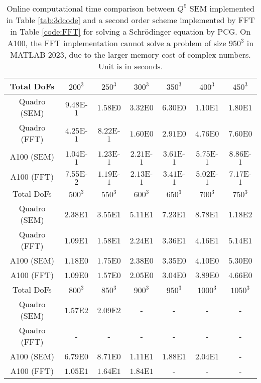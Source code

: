 \documentclass{article}
\begin{document}
\begin{table}[ht!]
    \centering
    \begin{tabular}{|c|c|c|c|c|c|c|}
    \hline
         Total DoFs  & $200^3$ & $250^3$ & $300^3$ & $350^3$ & $400^3$ & $450^3$\\
    \hline
         Quadro (SEM) & $9.48$E-$1$ & $1.58$E$0$ & $3.32$E$0$ & $6.30$E$0$ & $1.10$E$1$ & $1.80$E$1$\\
    \hline
         Quadro (FFT) & $4.25$E-$1$ & $8.22$E-$1$ & $1.60$E$0$ & $2.91$E$0$ & $4.76$E$0$ & $7.60$E$0$\\
    \hline
         A100 (SEM) & $1.04$E-$1$ & $1.23$E-$1$ & $2.21$E-$1$ & $3.61$E-$1$ & $5.75$E-$1$ & $8.86$E-$1$\\
    \hline
         A100 (FFT) & $7.55$E-$2$ & $1.19$E-$1$ & $2.13$E-$1$ & $3.41$E-$1$ & $5.02$E-$1$ & $7.17$E-$1$\\
    \hline
    \hline
         Total DoFs & $500^3$ & $550^3$ & $600^3$ & $650^3$ & $700^3$ & $750^3$\\
    \hline
         Quadro (SEM) & $2.38$E$1$ & $3.55$E$1$ & $5.11$E$1$ & $7.23$E$1$ & $8.78$E$1$ & $1.18$E$2$\\
    \hline
         Quadro (FFT) & $1.09$E$1$ & $1.58$E$1$ & $2.24$E$1$ & $3.36$E$1$ & $4.16$E$1$ & $5.14$E$1$\\
    \hline
         A100 (SEM) & $1.18$E$0$ & $1.75$E$0$ & $2.38$E$0$ & $3.35$E$0$ & $4.10$E$0$ & $5.30$E$0$\\
    \hline
         A100 (FFT) & $1.09$E$0$ & $1.57$E$0$ & $2.05$E$0$ & $3.04$E$0$ & $3.89$E$0$ & $4.66$E$0$\\
    \hline
    \hline
         Total DoFs & $800^3$ & $850^3$ & $900^3$ & $950^3$ & $1000^3$ & $1050^3$\\
    \hline
         Quadro (SEM) & $1.57$E$2$ & $2.09$E$2$ & - & - & - & -\\
    \hline
         Quadro (FFT) & - & - & - & - & - & -\\
    \hline
         A100 (SEM) & $6.79$E$0$ & $8.71$E$0$ & $1.11$E$1$ & $1.88$E$1$ & $2.04$E$1$ & -\\
    \hline
         A100 (FFT) & $1.05$E$1$ & $1.64$E$1$ & $1.84$E$1$ & - & - & -\\
    \hline
    \end{tabular}
    \caption{Online computational time comparison between $Q^5$ SEM implemented in Table \ref{tab:3dcode} and a second order scheme implemented by FFT in Table \ref{code:FFT} for solving a Schr{\"o}dinger equation by PCG. On A100, the FFT implementation cannot solve a problem of size $950^3$ in MATLAB 2023, due to the larger memory cost of complex numbers. Unit is in seconds.}
    \label{tab6: schrodinger_FFT_SEM_beta1}
\end{table}
\newpage
\end{document}
